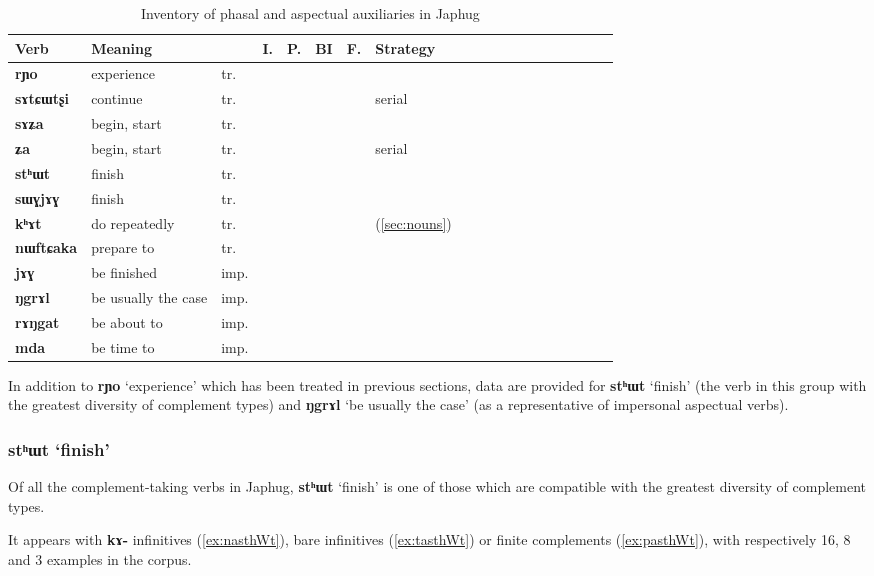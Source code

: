 \documentclass[oneside,a4paper,11pt]{article}
\newcommand{\ipa}[1]{\textbf{\phon#1}} %
\newcommand{\jpg}[2]{\ipa{#1} `#2'} %
\newcommand{\refb}[1]{(\ref{#1})}
\newcommand{\N}{}
\newcommand{\Y}{\Checkmark}
\begin{document}
\begin{table}[H]
\caption{Inventory of phasal and aspectual auxiliaries in Japhug} \label{tab:phasal} 
\begin{tabular}{lllllllllllllllllll}
\toprule
Verb & 	Meaning & 	 & 	I. & 	P.& 	BI & 	F. & 	Strategy & 	\\
\midrule
\ipa{rɲo} & 	experience & 	tr. & 	\Y & 	\N & 	\Y & 	\N & 	\N & 	\\
\ipa{sɤtɕɯtʂi} & 	continue & 	tr. & 	\Y & 	\N & 	\Y & 	\Y & 	serial & 	\\
\ipa{sɤʑa} & 	begin, start & 	tr. & 	\Y & 	\N & 	\Y & 	\N & 	\N & 	\\
\ipa{ʑa} & 	begin, start & 	tr. & 	\Y & 	\N & 	\Y & 	\N & 	serial & 	\\
\ipa{stʰɯt} & 	finish & 	tr. & 	\Y & 	\N & 	\Y & 	\Y & 	\N & 	\\
\ipa{sɯɣjɤɣ} & 	finish & 	tr. & 	\Y & 	\N & 	\N & 	\N & 	\N & 	\\
\ipa{kʰɤt} & 	do repeatedly & 	tr. & 	\Y & 	\N & 	\N & 	\N & 	\refb{sec:nouns}& 	\\
\ipa{nɯftɕaka} & prepare to & 	tr. & 	\Y & 	\N & 	\N & 	\Y & 	\N & 	\\
\midrule
\ipa{jɤɣ} & 	be finished & 	imp. & 	\Y & 	\N & 	\Y & 	\N & 	\N & 	\\
\ipa{ŋgrɤl} & 	be usually the case & 	imp. & 	\N & 	\N & 	\N & 	\Y & 	\N & 	\\
\ipa{rɤŋgat} & 	be about to & 	imp. & 	\N & 	\Y & 	\Y & 	\N & 	\N & 	\\
\ipa{mda} & 	be time to & 	imp. & 	\Y & 	\N & \N & 	\Y & 	\N & 	\\
\bottomrule
\end{tabular}
\end{table}

In addition to \jpg{rɲo}{experience} which has been treated in previous sections, data are provided for \jpg{stʰɯt}{finish} (the verb in this group with the greatest diversity of complement types) and \jpg{ŋgrɤl}{be usually the case} (as a representative of impersonal aspectual verbs).

\subsubsection{\jpg{stʰɯt}{finish}}
Of all the complement-taking verbs in Japhug, \jpg{stʰɯt}{finish} is one of those which are compatible with the greatest diversity of complement types.

It appears with \ipa{kɤ-} infinitives (\ref{ex:nasthWt}), bare infinitives (\ref{ex:tasthWt}) or finite complements (\ref{ex:pasthWt}), with respectively 16, 8 and 3 examples in the corpus. 
\end{document}
